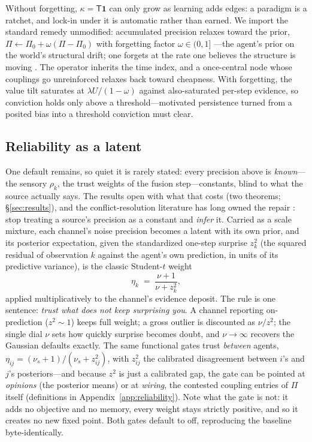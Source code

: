 \documentclass[runningheads]{llncs}
\newcommand{\Top}{\mathsf{T}}          %
\newcommand{\bone}{\mathbf{1}}         %
\begin{document}
Without forgetting, $\kappa=\Top\bone$ can only grow as learning adds edges: a paradigm is a
ratchet, and lock-in under it is automatic rather than earned. We import the standard remedy
unmodified: accumulated precision relaxes toward the prior, $\Pi\leftarrow\Pi_0+\omega(\Pi-\Pi_0)$
with forgetting factor $\omega\in(0,1]$ \citep{friston2017process,smith2022tutorial}---the
agent's prior on the world's structural drift; one forgets at the rate one believes the
structure is moving \citep{mathys2011}. The operator inherits the time index, and a once-central
node whose couplings go unreinforced relaxes back toward cheapness. With forgetting, the value
tilt saturates at $\lambda U/(1-\omega)$ against also-saturated per-step evidence, so conviction
holds only above a threshold---motivated persistence turned from a posited bias into a threshold
conviction must clear.

\subsection{Reliability as a latent}
\label{sec:reliability}

One default remains, so quiet it is rarely stated: every precision above is \emph{known}---the
sensory $\rho_k$, the trust weights of the fusion step---constants, blind to what the source
actually says. The results open with what that costs (two theorems; \S\ref{sec:results}), and
the conflict-resolution literature has long owned the repair \citep{ohagan2012}: stop treating
a source's precision as a constant and \emph{infer} it. Carried as a scale mixture, each
channel's noise precision becomes a latent with its own prior, and its posterior expectation,
given the standardized one-step surprise $z_k^2$ (the squared residual of observation $k$
against the agent's own prediction, in units of its predictive variance), is the classic
Student-$t$ weight
\begin{equation}
\eta_k \;=\; \frac{\nu+1}{\nu+z_k^2},
\label{eq:lambda}
\end{equation}
applied multiplicatively to the channel's evidence deposit. The rule is one sentence:
\emph{trust what does not keep surprising you}. A channel reporting on-prediction
($z^2\!\sim\!1$) keeps full weight; a gross outlier is discounted as $\nu/z^2$; the single dial
$\nu$ sets how quickly surprise becomes doubt, and $\nu\to\infty$ recovers the Gaussian
defaults exactly. The same functional gates trust \emph{between} agents,
$\eta_{ij}=(\nu_s+1)/(\nu_s+z_{ij}^2)$, with $z_{ij}^2$ the calibrated disagreement between
$i$'s and $j$'s posteriors---and because $z^2$ is just a calibrated gap, the gate can be
pointed at \emph{opinions} (the posterior means) or at \emph{wiring}, the contested coupling
entries of $\Pi$ itself (definitions in Appendix~\ref{app:reliability}). Note what the gate is
not: it adds no objective and no memory, every weight stays strictly positive, and so it
creates no new fixed point. Both gates default to off, reproducing the baseline
byte-identically.
\end{document}
